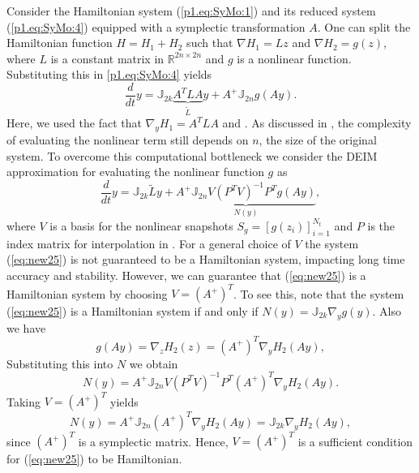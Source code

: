 Consider the Hamiltonian system (\ref{p1.eq:SyMo:1}) and its reduced system (\ref{p1.eq:SyMo:4}) equipped with a symplectic transformation $A$. One can split the Hamiltonian function $H = H_1 + H_2$ such that $\nabla H_1 = L z$ and $\nabla H_2 = g(z)$, where $L$ is a constant matrix in $\mathbb R^{2n\times 2n}$ and $g$ is a nonlinear function. Substituting this in \eqref{p1.eq:SyMo:4} yields
\begin{equation} \label{eq:new24}
	\frac{d}{dt} y = \mathbb J_{2k}\underbrace{ A^T L A}_{\tilde L} y + A^+ \mathbb J_{2n} g(Ay).
\end{equation}
Here, we used the fact that $\nabla_y H_1 = A^TLA$ and . As discussed in , the complexity of evaluating the nonlinear term still depends on $n$, the size of the original system. To overcome this computational bottleneck we consider the DEIM approximation for evaluating the nonlinear function $g$ as
\begin{equation} \label{eq:new25}
	\frac{d}{dt} y = \mathbb J_{2k} \tilde L y + \underbrace{ A^+ \mathbb J_{2n} V (P^TV)^{-1} P^T g(Ay) }_{N( y)},
\end{equation}
where $V$ is a basis for the nonlinear snapshots $S_{g} = [g(z_i)]_{i=1}^{N_t}$ and $P$ is the index matrix for interpolation in . For a general choice of $V$ the system (\ref{eq:new25}) is not guaranteed to be a Hamiltonian system, impacting long time accuracy and stability. However, we can guarantee that (\ref{eq:new25}) is a Hamiltonian system by choosing $V=(A^+)^T$. To see this, note that the system (\ref{eq:new25}) is a Hamiltonian system if and only if $N(y) = \mathbb J_{2k} \nabla_{y} g(y)$. Also we have 
\begin{equation} \label{eq:new26}
	g(Ay) = \nabla_{z} H_2(z) = (A^+)^T \nabla_{y} H_2(Ay),
\end{equation}
Substituting this into $N$ we obtain
\begin{equation} \label{eq:new27}
	N(y)= A^+ \mathbb J_{2n} V (P^TV)^{-1} P^T  (A^+)^T \nabla_{ y} H_2(Ay).
\end{equation}
Taking $V = (A^+)^T$ yields
\begin{equation} \label{eq:new28}
	N(y) = A^+ \mathbb J_{2n}(A^+)^T \nabla_{y} H_2(Ay) = \mathbb J_{2k} \nabla_{y} H_2(A y),
\end{equation}
since $(A^+)^T$ is a symplectic matrix. Hence, $V = (A^+)^T$ is a sufficient condition for (\ref{eq:new25}) to be Hamiltonian. 

